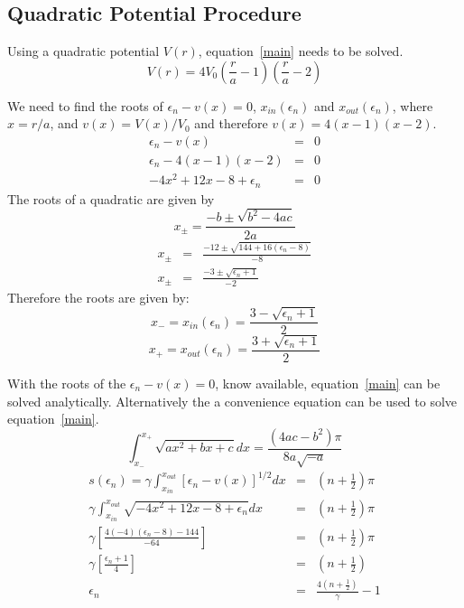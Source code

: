 \documentclass[a4paper]{IEEEtran}
\begin{document}
\subsection{Quadratic Potential Procedure}

    Using a quadratic potential $V(r)$, equation~\ref{main} needs to be solved.
    \[ V(r) = 4V_0 \left( \frac{r}{a} - 1 \right) 
                   \left( \frac{r}{a} - 2\right) \]

    We need to find the roots of $\epsilon_n - v(x) = 0$,
    $x_{in}(\epsilon_n)$ and $x_{out}(\epsilon_n)$, where 
    $x = r/a$, and $v(x) = V(x)/V_0$ and therefore $v(x) = 4(x-1)(x-2)$.
    \begin{eqnarray}
        \epsilon_n - v(x)   & = & 0 \nonumber \\
        \epsilon_n - 4(x-1)(x-2) & = & 0 \nonumber \\
        -4x^2 + 12x - 8 + \epsilon_n & = & 0 \nonumber
    \end{eqnarray}
    The roots of a quadratic are given by
    \[ x_\pm = \frac{-b \pm \sqrt{b^2 - 4ac} }{2a}\]
    \begin{eqnarray}
    x_{\pm} & = & \frac{-12 \pm \sqrt{144 + 16(\epsilon_n - 8)} }{-8} \nonumber \\
    x_{\pm} & = & \frac{-3 \pm \sqrt{\epsilon_n + 1}}{-2} \nonumber
    \end{eqnarray}
    Therefore the roots are given by:
    \[ x_- = x_{in}(\epsilon_n) = \frac{3 - \sqrt{\epsilon_n + 1} }{2} \]
    \[ x_+ = x_{out}(\epsilon_n) = \frac{3 + \sqrt{\epsilon_n + 1} }{2} \]

    With the roots of the $\epsilon_n - v(x) = 0$, know available,
    equation~\ref{main} can be solved analytically. Alternatively the
    a convenience equation can be used to solve equation~\ref{main}.
    \[ \int_{x_-}^{x_+} \sqrt{ax^2 + bx + c} dx = \frac{(4ac - b^2)\pi}{8a\sqrt{-a}} \]
    \begin{eqnarray}
        s(\epsilon_n) = \gamma\int_{x_{in}}^{x_{out}} [\epsilon_n - v(x)]^{1/2} dx & = &
                        \left( n + \frac{1}{2} \right)\pi \nonumber \\
        \gamma\int_{x_{in}}^{x_{out}} \sqrt{-4x^2 + 12x - 8 + \epsilon_n } dx & = & 
                        \left( n + \frac{1}{2} \right)\pi \nonumber \\
        \gamma\left[ \frac{4(-4)(\epsilon_n - 8) - 144}{-64} \right] & = &
                        \left( n + \frac{1}{2} \right)\pi \nonumber \\
        \gamma\left[ \frac{\epsilon_n + 1}{4} \right] & = &
                        \left( n + \frac{1}{2} \right) \nonumber \\
        \epsilon_n & = & \frac{4\left(n + \frac{1}{2}\right)}{\gamma} - 1 \nonumber
    \end{eqnarray}
\end{document}
